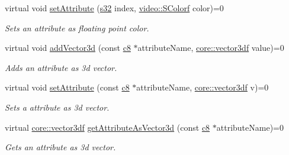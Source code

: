 \begin{DoxyCompactItemize}
\mbox{\label{classirr_1_1io_1_1IAttributes_a9f5e93e5ee0f270973de42ad32b0b616}} 
virtual void \hyperlink{classirr_1_1io_1_1IAttributes_a9f5e93e5ee0f270973de42ad32b0b616}{set\+Attribute} (\hyperlink{namespaceirr_ac66849b7a6ed16e30ebede579f9b47c6}{s32} index, \hyperlink{classirr_1_1video_1_1SColorf}{video\+::\+S\+Colorf} color)=0
\begin{DoxyCompactList}\small\item\em Sets an attribute as floating point color. \end{DoxyCompactList}\item 
\mbox{\label{classirr_1_1io_1_1IAttributes_aee73f5e51ad978b2bf146d10725da72f}} 
virtual void \hyperlink{classirr_1_1io_1_1IAttributes_aee73f5e51ad978b2bf146d10725da72f}{add\+Vector3d} (const \hyperlink{namespaceirr_a9395eaea339bcb546b319e9c96bf7410}{c8} $\ast$attribute\+Name, \hyperlink{namespaceirr_1_1core_ae6e2b2a6c552833ebbd5b7463d03586b}{core\+::vector3df} value)=0
\begin{DoxyCompactList}\small\item\em Adds an attribute as 3d vector. \end{DoxyCompactList}\item 
\mbox{\label{classirr_1_1io_1_1IAttributes_ac08a589c89febec76cfd942fad0bb519}} 
virtual void \hyperlink{classirr_1_1io_1_1IAttributes_ac08a589c89febec76cfd942fad0bb519}{set\+Attribute} (const \hyperlink{namespaceirr_a9395eaea339bcb546b319e9c96bf7410}{c8} $\ast$attribute\+Name, \hyperlink{namespaceirr_1_1core_ae6e2b2a6c552833ebbd5b7463d03586b}{core\+::vector3df} v)=0
\begin{DoxyCompactList}\small\item\em Sets a attribute as 3d vector. \end{DoxyCompactList}\item 
virtual \hyperlink{namespaceirr_1_1core_ae6e2b2a6c552833ebbd5b7463d03586b}{core\+::vector3df} \hyperlink{classirr_1_1io_1_1IAttributes_ac4ad5d4db7fd08e0523d3f8e671c2f68}{get\+Attribute\+As\+Vector3d} (const \hyperlink{namespaceirr_a9395eaea339bcb546b319e9c96bf7410}{c8} $\ast$attribute\+Name)=0
\begin{DoxyCompactList}\small\item\em Gets an attribute as 3d vector. \end{DoxyCompactList}\item 

\end{DoxyCompactItemize}
